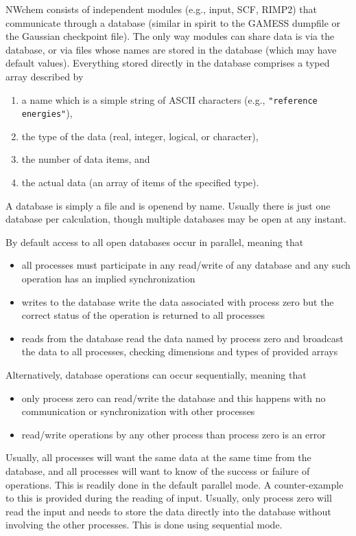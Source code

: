 NWchem consists of independent modules (e.g., input, SCF, RIMP2) that
communicate through a database (similar in spirit to the GAMESS
dumpfile or the Gaussian checkpoint file).  The only way modules can
share data is via the database, or via files whose names are stored in
the database (which may have default values).  Everything stored
directly in the database comprises a typed array described by
\begin{enumerate}
\item a name which is a simple string of ASCII characters (e.g., 
      \verb+"reference energies"+),
\item the type of the data (real, integer, logical, or character), 
\item the number of data items, and
\item the actual data (an array of items of the specified type).
\end{enumerate}

A database is simply a file and is openend by name. Usually there is
just one database per calculation, though multiple databases may be
open at any instant.  

By default access to all open databases occur in parallel, meaning
that
\begin{itemize}
\item all processes must participate in any read/write of any database
  and any such operation has an implied synchronization
\item writes to the database write the data associated with process
  zero but the correct status of the operation is returned to all
  processes
\item reads from the database read the data named by process zero and
  broadcast the data to all processes, checking dimensions and types
  of provided arrays
\end{itemize}

Alternatively, database operations can occur sequentially, meaning
that
\begin{itemize}
\item only process zero can read/write the database and this happens
  with no communication or synchronization with other processes
\item read/write operations by any other process than process zero is
  an error
\end{itemize}

Usually, all processes will want the same data at the same time from
the database, and all processes will want to know of the success or
failure of operations.  This is readily done in the default parallel
mode.  A counter-example to this is provided during the reading of input.
Usually, only process zero will read the input and needs to store the
data directly into the database without involving the other processes.
This is done using sequential mode.

